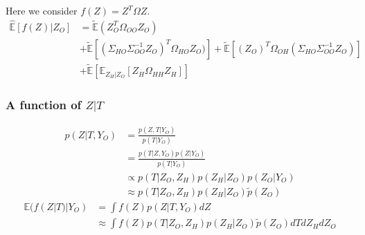 \documentclass[11pt,a4paper]{article}
\newcommand{\Esp}{\mathds{E}}
\begin{document}
 Here we consider $f(Z) = Z^T\Omega Z$.
\begin{align*}
\widehat{\Esp}[f(Z)|Z_O] &= \tilde{\Esp}(Z_O^T\Omega_{OO}Z_O)\\
& +\tilde{\Esp}\left[(\Sigma_{HO}\Sigma_{OO}^{-1} Z_O)^T \Omega_{HO}Z_O)\right] +\tilde{\Esp}\left[(Z_O)^T \Omega_{OH} (\Sigma_{HO}\Sigma_{OO}^{-1} Z_O)\right]\\
&+ \tilde{\Esp}\left[\Esp_{Z_H|Z_O} [Z_H\Omega_{HH}Z_H]\right]
\end{align*}


\subsubsection{A function of $Z|T$}
\begin{align*}
 p(Z|T,Y_O) &= \frac{p(Z,T|Y_O)}{p(T|Y_O)}\\
 &= \frac{p(T|Z,Y_O) p(Z|Y_O)}{p(T|Y_O)}\\
 & \propto p(T|Z_O,Z_H) p(Z_H|Z_O) p(Z_O|Y_O)\\
 &\approx  p(T|Z_O,Z_H) p(Z_H|Z_O)  \tilde{p}(Z_O) 
\end{align*}
\begin{align*}
\Esp(f(Z|T)|Y_O) &=\int f(Z) p(Z|T,Y_O) dZ\\
&\approx \int f(Z) p(T|Z_O,Z_H)p(Z_H|Z_O)\tilde{p}(Z_O) dT dZ_H dZ_O
\end{align*}
\end{document}
